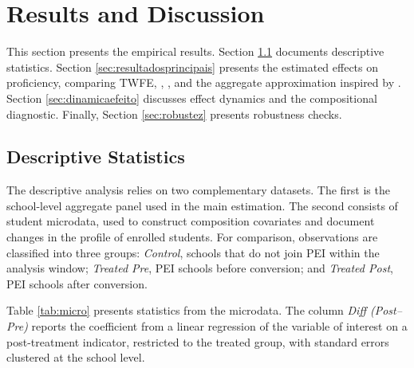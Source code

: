 \section{Results and Discussion} \label{sec:results}

This section presents the empirical results. Section \ref{sec:descritivo} documents descriptive statistics. Section \ref{sec:resultadosprincipais} presents the estimated effects on proficiency, comparing TWFE, \textcite{callawaysantanna}, \textcite{santannazhao}, and the aggregate approximation inspired by \textcite{santannaxu}. Section \ref{sec:dinamicaefeito} discusses effect dynamics and the compositional diagnostic. Finally, Section \ref{sec:robustez} presents robustness checks.

\subsection{Descriptive Statistics} \label{sec:descritivo}

The descriptive analysis relies on two complementary datasets. The first is the school-level aggregate panel used in the main estimation. The second consists of student microdata, used to construct composition covariates and document changes in the profile of enrolled students. For comparison, observations are classified into three groups: \textit{Control}, schools that do not join PEI within the analysis window; \textit{Treated Pre}, PEI schools before conversion; and \textit{Treated Post}, PEI schools after conversion.

Table \ref{tab:micro} presents statistics from the microdata. The column \textit{Diff (Post--Pre)} reports the coefficient from a linear regression of the variable of interest on a post-treatment indicator, restricted to the treated group, with standard errors clustered at the school level.

